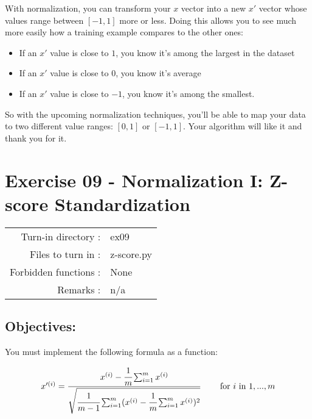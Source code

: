 \documentclass[]{article}
\begin{document}
With normalization, you can transform your \(x\) vector into a new
\(x'\) vector whose values range between \([-1, 1]\) more or less. Doing
this allows you to see much more easily how a training example compares
to the other ones:

\begin{itemize}
\item
  If an \(x'\) value is close to \(1\), you know it's among the largest
  in the dataset
\item
  If an \(x'\) value is close to \(0\), you know it's average
\item
  If an \(x'\) value is close to \(-1\), you know it's among the
  smallest.
\end{itemize}

So with the upcoming normalization techniques, you'll be able to map
your data to two different value ranges: \([0, 1]\) or \([-1, 1]\). Your
algorithm will like it and thank you for it.\\
\clearpage

\hypertarget{exercise-09---normalization-i-z-score-standardization-1}{%
\section{Exercise 09 - Normalization I: Z-score
Standardization}\label{exercise-09---normalization-i-z-score-standardization-1}}

\begin{longtable}[]{@{}rl@{}}
\toprule
\endhead
Turn-in directory : & ex09\tabularnewline
Files to turn in : & z-score.py\tabularnewline
Forbidden functions : & None\tabularnewline
Remarks : & n/a\tabularnewline
\bottomrule
\end{longtable}

\hypertarget{objectives-7}{%
\subsection{Objectives:}\label{objectives-7}}

You must implement the following formula as a function:

\large

\[
\begin{matrix}
 x'^{(i)} = \cfrac{x^{(i)} - \cfrac{1}{m} \sum_{i = 1}^{m} x^{(i)}}{\sqrt{\cfrac{1}{m - 1} \sum_{i = 1}^{m} (x^{(i)} - \cfrac{1}{m} \sum_{i = 1}^{m} x^{(i)})^{2}}} & &\text{ for $i$ in $1, ..., m$} 
\end{matrix}
\] \normalsize
\end{document}
